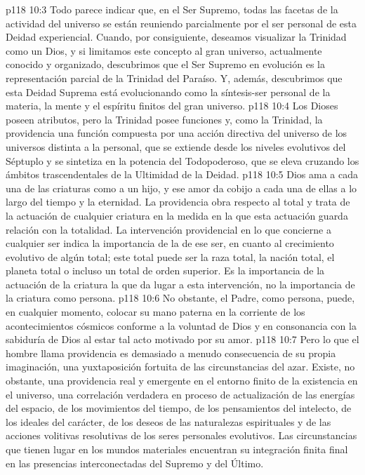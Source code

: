 \vs p118 10:3 Todo parece indicar que, en el Ser Supremo, todas las facetas de la actividad del universo se están reuniendo parcialmente por el ser personal de esta Deidad experiencial. Cuando, por consiguiente, deseamos visualizar la Trinidad como un Dios, y si limitamos este concepto al gran universo, actualmente conocido y organizado, descubrimos que el Ser Supremo en evolución es la representación parcial de la Trinidad del Paraíso. Y, además, descubrimos que esta Deidad Suprema está evolucionando como la síntesis\hyp{}ser personal de la materia, la mente y el espíritu finitos del gran universo.
\vs p118 10:4 Los Dioses poseen atributos, pero la Trinidad posee funciones y, como la Trinidad, la providencia  una función compuesta por una acción directiva del universo de los universos distinta a la personal, que se extiende desde los niveles evolutivos del Séptuplo y se sintetiza en la potencia del Todopoderoso, que se eleva cruzando los ámbitos trascendentales de la Ultimidad de la Deidad.
\vs p118 10:5 \pc Dios ama a cada una de las criaturas como a un hijo, y ese amor da cobijo a cada una de ellas a lo largo del tiempo y la eternidad. La providencia obra respecto al total y trata de la actuación de cualquier criatura en la medida en la que esta actuación guarda relación con la totalidad. La intervención providencial en lo que concierne a cualquier ser indica la importancia de la  de ese ser, en cuanto al crecimiento evolutivo de algún total; este total puede ser la raza total, la nación total, el planeta total o incluso un total de orden superior. Es la importancia de la actuación de la criatura la que da lugar a esta intervención, no la importancia de la criatura como persona.
\vs p118 10:6 No obstante, el Padre, como persona, puede, en cualquier momento, colocar su mano paterna en la corriente de los acontecimientos cósmicos conforme a la voluntad de Dios y en consonancia con la sabiduría de Dios al estar tal acto motivado por su amor.
\vs p118 10:7 Pero lo que el hombre llama providencia es demasiado a menudo consecuencia de su propia imaginación, una yuxtaposición fortuita de las circunstancias del azar. Existe, no obstante, una providencia real y emergente en el entorno finito de la existencia en el universo, una correlación verdadera en proceso de actualización de las energías del espacio, de los movimientos del tiempo, de los pensamientos del intelecto, de los ideales del carácter, de los deseos de las naturalezas espirituales y de las acciones volitivas resolutivas de los seres personales evolutivos. Las circunstancias que tienen lugar en los mundos materiales encuentran su integración finita final en las presencias interconectadas del Supremo y del Último.
